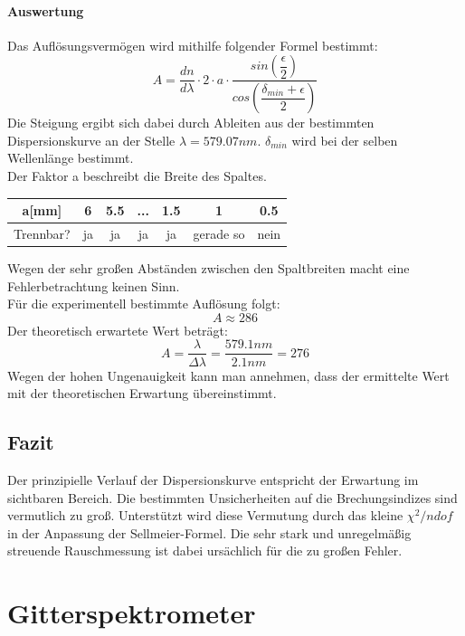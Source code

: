 \documentclass[12pt,a4paper]{article}
\begin{document}
\paragraph{Auswertung}
Das Auflösungsvermögen wird mithilfe folgender Formel bestimmt:
\begin{equation}
A = \dfrac{dn}{d\lambda}\cdot 2\cdot a\cdot\dfrac{sin\left(\dfrac{\epsilon}{2}\right)}{cos\left(\dfrac{\delta_{min}+\epsilon}{2}\right)}
\end{equation}
Die Steigung ergibt sich dabei durch Ableiten aus der bestimmten Dispersionskurve an der Stelle $\lambda = 579.07 nm$. $\delta_{min}$ wird bei der selben Wellenlänge bestimmt.\\
Der Faktor a beschreibt die Breite des Spaltes.
\begin{table}
\begin{tabular}{|c|c|c|c|c|c|c|}
\hline
a[mm] & 6 & 5.5 & ... & 1.5 & 1 & 0.5\\
\hline
Trennbar? & ja & ja & ja & ja & gerade so & nein\\
\hline
\end{tabular}
\end{table}
Wegen der sehr großen Abständen zwischen den Spaltbreiten macht eine Fehlerbetrachtung keinen Sinn.\\
Für die experimentell bestimmte Auflösung folgt:
\begin{equation}
A \approx 286
\end{equation}
Der theoretisch erwartete Wert beträgt:
\begin{equation}
A = \dfrac{\lambda}{\Delta \lambda} = \dfrac{579.1 nm}{2.1 nm} = 276
\end{equation}
Wegen der hohen Ungenauigkeit kann man annehmen, dass der ermittelte Wert mit der theoretischen Erwartung übereinstimmt.



\subsection{Fazit}
Der prinzipielle Verlauf der Dispersionskurve entspricht der Erwartung im sichtbaren Bereich.
Die bestimmten Unsicherheiten auf die Brechungsindizes sind vermutlich zu groß. Unterstützt wird diese Vermutung durch das kleine $\chi^2/ndof$ in der Anpassung der Sellmeier-Formel.
Die sehr stark und unregelmäßig streuende Rauschmessung ist dabei ursächlich für die zu großen Fehler.


\newpage
\section{Gitterspektrometer}
\end{document}
